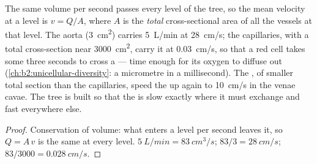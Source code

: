 \begin{theorem}\label{thm:b2:blood-circulation:continuity}
The same volume per second passes every level of the tree, so the
mean velocity at a level is $v = Q/A$, where $A$ is the \emph{total}
cross-sectional area of all the vessels at that level. The aorta
(\qty{3}{cm^2}) carries \qty{5}{L/min} at \qty{28}{cm/s}; the
capillaries, with a total cross-section near \qty{3000}{cm^2}, carry
it at \qty{0.03}{cm/s}, so that a red cell takes some three seconds to
cross a  --- time enough for its oxygen to diffuse out
(\cref{ch:b2:unicellular-diversity}: a micrometre in a
millisecond). The , of smaller total section than the
capillaries, speed the  up again to \qty{10}{cm/s} in the venae
cavae. The tree is built so that the  is slow exactly where it
must exchange and fast everywhere else.
\end{theorem}
\begin{proof}
Conservation of volume: what enters a level per second leaves it,
so $Q = A\,v$ is the same at every level. $\qty{5}{L/min} =
\qty{83}{cm^3/s}$; $83/3 = \qty{28}{cm/s}$; $83/3000 =
\qty{0.028}{cm/s}$.
\end{proof}

